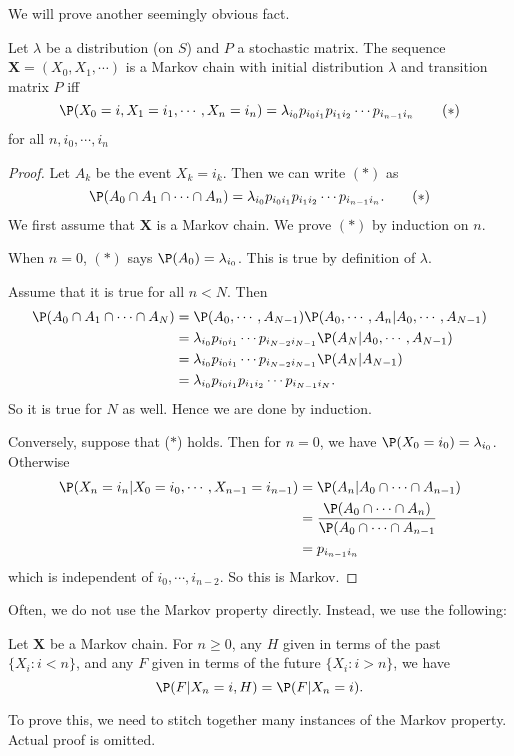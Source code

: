 \documentclass[a4paper]{article}
\begin{document}
We will prove another seemingly obvious fact.
\begin{thm}
  Let $\lambda$ be a distribution (on $S$) and $P$ a stochastic matrix. The sequence $\mathbf{X} = (X_0, X_1, \cdots)$ is a Markov chain with initial distribution $\lambda$ and transition matrix $P$ iff
  \[
    \P(X_0 = i, X_1 = i_1, \cdots, X_n = i_n) = \lambda_{i_0}p_{i_0 i_1}p_{i_1i_2}\cdots p_{i_{n - 1}i_n}\tag{$*$}
  \]
  for all $n, i_0, \cdots, i_n$
\end{thm}
\begin{proof}
  Let $A_k$ be the event $X_k = i_k$. Then we can write $(*)$ as
  \[
    \P(A_0\cap A_1\cap\cdots \cap A_n) = \lambda_{i_0}p_{i_0 i_1}p_{i_1i_2}\cdots p_{i_{n - 1}i_n}. \tag{$*$}
  \]
  We first assume that $\mathbf{X}$ is a Markov chain. We prove $(*)$ by induction on $n$.

  When $n = 0$, $(*)$ says $\P(A_0) = \lambda_{i_0}$. This is true by definition of $\lambda$.

  Assume that it is true for all $n < N$. Then
  \begin{align*}
    \P(A_0 \cap A_1 \cap \cdots \cap A_N) &= \P(A_0,\cdots, A_{N - 1})\P(A_0, \cdots, A_n | A_0, \cdots, A_{N - 1})\\
    &= \lambda_{i_0} p_{i_0 i_1}\cdots p_{i_{N - 2}i_{N - 1}} \P(A_{N} | A_0,\cdots, A_{N - 1})\\
    &= \lambda_{i_0} p_{i_0 i_1}\cdots p_{i_{N - 2}i_{N - 1}} \P(A_{N} | A_{N - 1})\\
    &= \lambda_{i_0}p_{i_0 i_1}p_{i_1i_2}\cdots p_{i_{N - 1}i_N}.
  \end{align*}
  So it is true for $N$ as well. Hence we are done by induction.

  Conversely, suppose that ($*$) holds. Then for $n = 0$, we have $\P(X_0 = i_0) = \lambda_{i_0}$. Otherwise
  \begin{align*}
    \P(X_n = i_n| X_0 = i_0, \cdots, X_{n - 1} = i_{n - 1}) &= \P(A_n | A_0 \cap \cdots\cap A_{n - 1})\\
    &= \frac{\P(A_0\cap \cdots \cap A_n)}{\P(A_0\cap \cdots \cap A_{n - 1}}\\
    &= p_{i_{n - 1}i_n}
  \end{align*}
  which is independent of $i_0, \cdots, i_{n - 2}$. So this is Markov.
\end{proof}

Often, we do not use the Markov property directly. Instead, we use the following:
\begin{thm}
  Let $\mathbf{X}$ be a Markov chain. For $n \geq 0$, any $H$ given in terms of the past $\{X_i: i < n\}$, and any $F$ given in terms of the future $\{X_i: i > n\}$, we have
  \[
    \P(F| X_n = i, H) = \P(F| X_n = i).
  \]
\end{thm}
To prove this, we need to stitch together many instances of the Markov property. Actual proof is omitted.
\end{document}
